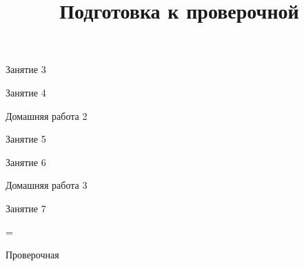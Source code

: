\begin{class}[number=3]
	\begin{listofex}
		\item Занятие 3 
	\end{listofex}
\end{class}

\begin{class}[number=4]
	\begin{listofex}
		\item Занятие 4
	\end{listofex}
\end{class}

\begin{homework}[number=2]
	\begin{listofex}
		\item Домашняя работа 2
	\end{listofex}
\end{homework}

\begin{class}[number=5]
	\begin{listofex}
		\item Занятие 5
	\end{listofex}
\end{class}

\begin{class}[number=6]
	\begin{listofex}
		\item Занятие 6
	\end{listofex}
\end{class}

\begin{homework}[number=3]
	\begin{listofex}
		\item Домашняя работа 3
	\end{listofex}
\end{homework}

\begin{class}[number=7]
	\title{Подготовка к проверочной}
	\begin{listofex}
		\item Занятие 7
	\end{listofex}
\end{class}

=%
\begin{exam}
	\begin{listofex}
		\item Проверочная
	\end{listofex}
\end{exam}
